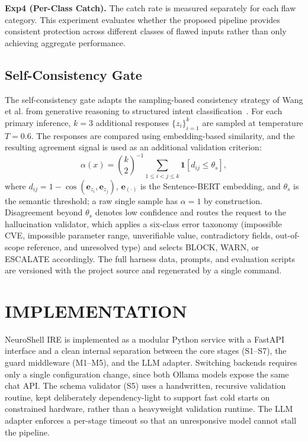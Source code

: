 \documentclass[a4paper,twoside]{article}
\begin{document}
\textbf{Exp4 (Per-Class Catch).} The catch rate is measured separately for each flaw category. This experiment evaluates whether the proposed pipeline provides consistent protection across different classes of flawed inputs rather than only achieving aggregate performance.

\subsection{Self-Consistency Gate}

\noindent The self-consistency gate adapts the sampling-based consistency strategy of Wang et al. from generative reasoning to structured intent classification~\cite{Wang23}. For each primary inference, $k=3$ additional responses $\{z_i\}_{i=1}^{k}$ are sampled at temperature $T=0.6$. The responses are compared using embedding-based similarity, and the resulting agreement signal is used as an additional validation criterion:
\begin{equation}\label{eq:alpha}
\alpha(x)=\binom{k}{2}^{-1}\sum_{1\le i<j\le k}\mathbf{1}\left[d_{ij}\le\theta_s\right],
\end{equation}
where $d_{ij}=1-\cos(\mathbf{e}_{z_i},\mathbf{e}_{z_j})$, $\mathbf{e}_{(\cdot)}$ is the Sentence-BERT embedding, and $\theta_s$ is the semantic threshold; a raw single sample has $\alpha=1$ by construction. Disagreement beyond $\theta_s$ denotes low confidence and routes the request to the hallucination validator, which applies a six-class error taxonomy (impossible CVE, impossible parameter range, unverifiable value, contradictory fields, out-of-scope reference, and unresolved type) and selects BLOCK, WARN, or ESCALATE accordingly. The full harness data, prompts, and evaluation scripts are versioned with the project source and regenerated by a single command.


\section{\uppercase{Implementation}}
\label{sec:implementation}

\noindent NeuroShell IRE is implemented as a modular Python service with a FastAPI interface and a clean internal separation between the core stages (S1--S7), the guard middleware (M1--M5), and the LLM adapter. Switching backends requires only a single configuration change, since both Ollama models expose the same chat API. The schema validator (S5) uses a handwritten, recursive validation routine, kept deliberately dependency-light to support fast cold starts on constrained hardware, rather than a heavyweight validation runtime. The LLM adapter enforces a per-stage timeout so that an unresponsive model cannot stall the pipeline.
\end{document}
